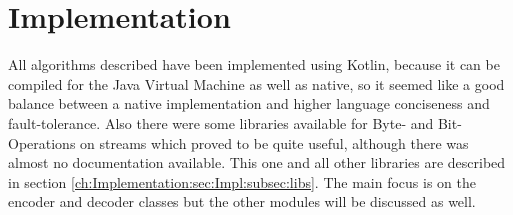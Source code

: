 \chapter{Implementation}
\label{ch:Implementation}
All algorithms described have been implemented using Kotlin, because it can be compiled for the Java Virtual Machine as well as native, so it seemed like a good balance between a native implementation and higher language conciseness and fault-tolerance. Also there were some libraries available for Byte- and Bit-Operations on streams which proved to be quite useful, although there was almost no documentation available. This one and all other libraries are described in section \ref{ch:Implementation:sec:Impl:subsec:libs}. The main focus is on the encoder and decoder classes but the other modules will be discussed as well.


